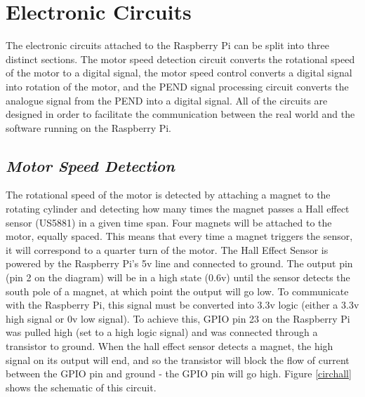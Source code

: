 \documentclass[a4]{report}
\begin{document}
	\section{Electronic Circuits}
	The electronic circuits attached to the Raspberry Pi can be split into three distinct sections. The motor speed detection circuit converts the rotational speed of the motor to a digital signal, the motor speed control converts a digital signal into rotation of the motor, and the PEND signal processing circuit converts the analogue signal from the PEND into a digital signal. All of the circuits are designed in order to facilitate the communication between the real world and the software running on the Raspberry Pi. 



	\subsection{\textit{Motor Speed Detection}}
	The rotational speed of the motor is detected by attaching a magnet to the rotating cylinder and detecting how many times the magnet passes a Hall effect sensor (US5881) in a given time span. Four magnets will be attached to the motor, equally spaced. This means that every time a magnet triggers the sensor, it will correspond to a quarter turn of the motor. The Hall Effect Sensor is powered by the Raspberry Pi's 5v line and connected to ground. The output pin (pin 2 on the diagram) will be in a high state (0.6v) until the sensor detects the south pole of a magnet, at which point the output will go low. To communicate with the Raspberry Pi, this signal must be converted into 3.3v logic (either a 3.3v high signal or 0v low signal). To achieve this, GPIO pin 23 on the Raspberry Pi was pulled high (set to a high logic signal) and was connected through a transistor to ground. When the hall effect sensor detects a magnet, the high signal on its output will end, and so the transistor will block the flow of current between the GPIO pin and ground - the GPIO pin will go high. Figure \ref{circhall} shows the schematic of this circuit. \newline
\end{document}

